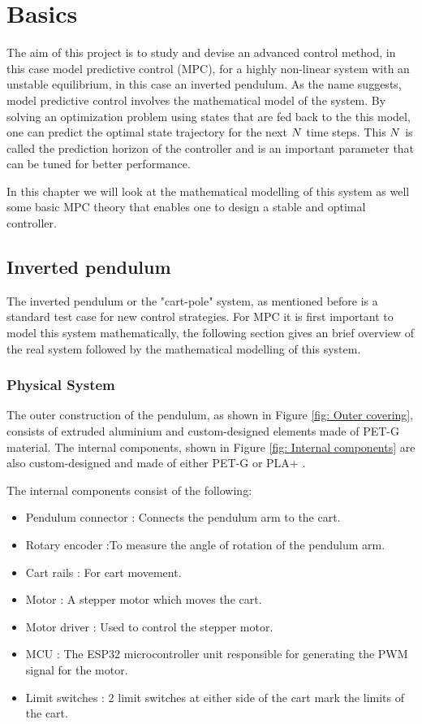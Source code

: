 \chapter{Basics} \label{Chapter 2}
\label{chap:first chapter}

The aim of this project is to study and devise an advanced control method, in this case model predictive control (MPC), for a highly non-linear system with an unstable equilibrium, in this case an inverted pendulum.
As the name suggests, model predictive control involves the mathematical model of the system. By solving an optimization problem using states that are fed back to the this model, one can predict the optimal state trajectory for the next $\mathnormal{N}$ time steps. This $\mathnormal{N}$ is called the prediction horizon of the controller and is an important parameter that can be tuned for better performance.

In this chapter we will look at the mathematical modelling of this system as well some basic MPC theory that enables one to design a stable and optimal controller. 

\section{Inverted pendulum}
The inverted pendulum or the "cart-pole" system, as mentioned before is a standard test case for new control strategies. For MPC it is first important to model this system mathematically, the following section gives an brief overview of the real system followed by the mathematical modelling of this system.

\subsection{Physical System}

The outer construction of the pendulum, as shown in Figure \ref{fig: Outer covering}, consists of extruded aluminium and custom-designed elements made of PET-G material. The internal components, shown in Figure \ref{fig: Internal components} are also custom-designed and made of either PET-G or PLA+ \cite{PendulumManual}.

The internal components consist of the following:
\begin{itemize}
	\item Pendulum connector : Connects the pendulum arm to the cart.
	\item Rotary encoder :To measure the angle of rotation of the pendulum arm.
	\item Cart rails : For cart movement.
	\item Motor : A stepper motor which moves the cart.
	\item Motor driver : Used to control the stepper motor. 
	\item MCU : The ESP32 microcontroller unit responsible for generating the PWM signal for the motor.
	\item Limit switches : 2 limit switches at either side of the cart mark the limits of the cart.
\end{itemize}


